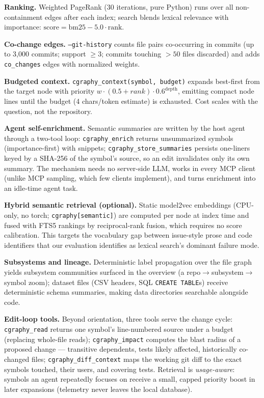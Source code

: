 \documentclass[11pt]{article}
\begin{document}
\textbf{Ranking.} Weighted PageRank (30 iterations, pure Python) runs over
all non-containment edges after each index; search blends lexical relevance
with importance: $\mathrm{score} = \mathrm{bm25} - 5.0\cdot\mathrm{rank}$.

\textbf{Co-change edges.} \texttt{--git-history} counts file pairs
co-occurring in commits (up to 3{,}000 commits; support $\geq 3$; commits
touching $>50$ files discarded) and adds \texttt{co\_changes} edges with
normalized weights.

\textbf{Budgeted context.} \texttt{cgraphy\_context(symbol, budget)}
expands best-first from the target node with priority
$w\cdot(0.5+\mathit{rank})\cdot 0.6^{\mathrm{depth}}$, emitting compact
node lines until the budget (4 chars/token estimate) is exhausted. Cost
scales with the question, not the repository.

\textbf{Agent self-enrichment.} Semantic summaries are written by the host
agent through a two-tool loop: \texttt{cgraphy\_enrich} returns
unsummarized symbols (importance-first) with snippets;
\texttt{cgraphy\_store\_summaries} persists one-liners keyed by a SHA-256
of the symbol's source, so an edit invalidates only its own summary. The
mechanism needs no server-side LLM, works in every MCP client (unlike MCP
sampling, which few clients implement), and turns enrichment into an
idle-time agent task.

\textbf{Hybrid semantic retrieval (optional).} Static
model2vec embeddings (CPU-only, no torch; \texttt{cgraphy[semantic]})
are computed per node at index time and fused with FTS5 rankings by
reciprocal-rank fusion, which requires no score calibration. This targets
the vocabulary gap between issue-style prose and code identifiers that our
evaluation identifies as lexical search's dominant failure mode.

\textbf{Subsystems and lineage.} Deterministic label propagation over the
file graph yields subsystem communities surfaced in the overview (a
repo$\rightarrow$subsystem$\rightarrow$symbol zoom); dataset files (CSV
headers, SQL \texttt{CREATE TABLE}s) receive deterministic schema
summaries, making data directories searchable alongside code.

\textbf{Edit-loop tools.} Beyond orientation, three tools serve the
change cycle: \texttt{cgraphy\_read} returns one symbol's line-numbered
source under a budget (replacing whole-file reads);
\texttt{cgraphy\_impact} computes the blast radius of a proposed change ---
transitive dependents, tests likely affected, historically co-changed
files; \texttt{cgraphy\_diff\_context} maps the working git diff to the
exact symbols touched, their users, and covering tests. Retrieval is
\emph{usage-aware}: symbols an agent repeatedly focuses on receive a
small, capped priority boost in later expansions (telemetry never leaves
the local database).
\end{document}
